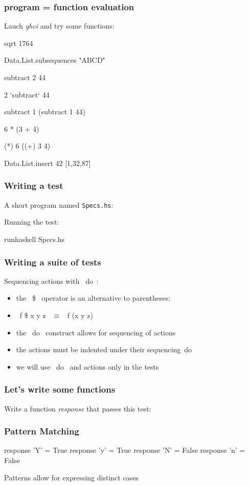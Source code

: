 \documentclass[11pt,xcolor={dvipsnames}]{beamer}
\newcommand{\tc}{\textcolor}
\newcommand{\key}[1]{\tc{orange}{#1}}
\newcommand{\rk}{\enskip{\key{$\hookleftarrow$}}}
\newcommand{\vs}{\vspace{1em}}
\begin{document}
\begin{frame}[fragile]
\frametitle{program = function evaluation}
Lauch \emph{ghci} and try some functions:
\begin{term}
sqrt 1764\rk

Data.List.subsequences "ABCD"\rk

subtract 2 44\rk

 2 `subtract` 44\rk

subtract 1 (subtract 1 44)\rk

6 * (3 + 4)\rk

(*) 6 ((+) 3 4)\rk

Data.List.insert 42 [1,32,87]\rk
\end{term}
\end{frame}
\begin{frame}[fragile]
\frametitle{Writing a test}

A short program named \texttt{Specs.hs}:

\vs
Running the test:
\begin{term}
runhaskell Specs.hs\rk
\end{term}
\end{frame}
\begin{frame}[fragile]
\frametitle{Writing a suite of tests}
Sequencing actions with ~do~:

\begin{itemize}
\item the ~\$~ operator is an alternative to parentheses:
\item ~f \$ x y z~ $\equiv$ ~f (x y z)~
\item the ~do~ construct allows for sequencing of actions
\item the actions must be indented under their sequencing~do~ 
\item we will use ~do~ and actions only in the tests
\end{itemize}
\end{frame}
\begin{frame}[fragile]
\frametitle{Let's write some functions}
Write a function \emph{response} that passes this test:

\end{frame}
\begin{frame}[fragile]
\frametitle{Pattern Matching}
\begin{haskell}
response 'Y' = True
response 'y' = True
response 'N' = False
response 'n' = False
\end{haskell}
\vs
Patterns allow for expressing distinct cases 
\end{frame}
\end{document}
